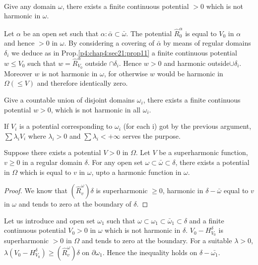 \begin{enumerate}[(i)]
~
\vskip -1.24cm \phantom{a}
  \begin{prop}\label{p4:chap4:sec21:prop12} %
    Give any domain $\omega$, there exists a finite continuous
    potential $> 0$ which is not harmonic in $\omega$.  
  \end{prop}
  
  Let $\alpha$ be an open set such that $\alpha : \bar{\alpha} \subset
  \bar{\omega}$. The potential $\hat{R}^\alpha_0$ is equal to $V_0$ in
  $\alpha$ and hence $> 0$ in $\omega$. By considering a covering of
  $\bar{\alpha}$ by means of regular domains $\delta_i$ we deduce as
  in Prop.\ref{p4:chap4:sec21:prop11} a finite continuous potential $w \le V_0$ such that $w
  = \hat{R}^\alpha_{V_0}$ outside $\cap \delta _i$. Hence $w > 0$ and
  harmonic outside\pageoriginale $\cup \delta_i$. Moreover $w$ is not harmonic in
  $\omega$, for otherwise $w$ would be harmonic in $\Omega (\le V)$
  and  therefore identically zero. 
\end{enumerate}

\begin{extension}
  Give a countable union of disjoint domains $\omega_i$, there exists
  a finite continuous potential $w > 0$, which is not harmonic in all
  $\omega_i$. 
\end{extension}

If $V_i$ is a potential corresponding to $\omega_i$ (for each i) got
by the previous argument, $\sum \lambda_i V_i$ where $\lambda_i > 0$
and $\sum \lambda_i < + \infty$ serves the purpose. 

\begin{thm} \label{p4:chap4:sec21:thm14} %
  Suppose there exists a potential $V > 0$ in $\Omega$. Let $V$ be a
  superharmonic function, $v \ge 0$ in a regular domain $\delta$. For
  any open set $\omega \subset \bar{\omega} \subset \delta$, there
  exists a potential in $\Omega$ which is equal to $v$ in $\omega$,
  upto a harmonic function in $\omega$. 
\end{thm}

\begin{proof}
  We know that $(\hat{R}^\omega_v) \delta$ is superharmonic $\ge 0$,
  harmonic in $\delta - \bar{\omega}$ equal to $v$ in $\omega$ and
  tends to zero at the boundary of $\delta$. 
\end{proof}

Let us introduce and open set $\omega_1$ such that $\omega \subset
\omega_1 \subset \bar{\omega}_1 \subset \delta$ and a finite
continuous potential $V_0 > 0$ in $\omega$ which is not harmonic in
$\delta$. $V_0 - H^\delta_{V_0}$ is superharmonic $> 0$ in $\Omega$  and
tends to zero at the boundary. For a suitable $\lambda > 0$, $\lambda
(V_0 - H^\delta_{V_0}) \ge (\hat{R}^\omega_{v}) \delta$ on $\partial
\omega_1$. Hence the inequality holds on $\delta - \bar{\omega_1}$. 

